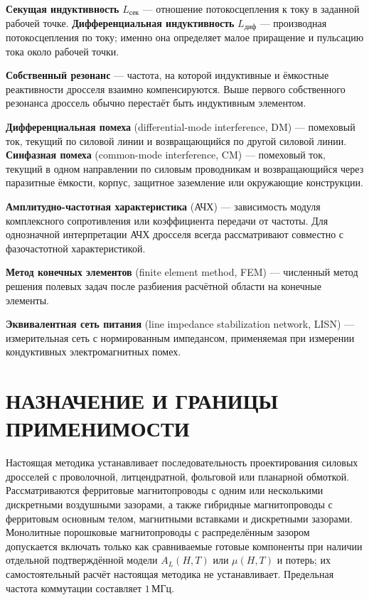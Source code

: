 \documentclass[14pt,a4paper]{extarticle}
\begin{document}
\textbf{Секущая индуктивность} $L_{\text{сек}}$ --- отношение потокосцепления
к току в заданной рабочей точке. \textbf{Дифференциальная индуктивность}
$L_{\text{диф}}$ --- производная потокосцепления по току; именно она определяет
малое приращение и пульсацию тока около рабочей точки.

\textbf{Собственный резонанс} --- частота, на которой индуктивные и ёмкостные
реактивности дросселя взаимно компенсируются. Выше первого собственного
резонанса дроссель обычно перестаёт быть индуктивным элементом.

\textbf{Дифференциальная помеха} (differential-mode interference, DM) ---
помеховый ток, текущий по силовой линии и возвращающийся по другой силовой
линии. \textbf{Синфазная помеха} (common-mode interference, CM) --- помеховый
ток, текущий в одном направлении по силовым проводникам и возвращающийся через
паразитные ёмкости, корпус, защитное заземление или окружающие конструкции.

\textbf{Амплитудно-частотная характеристика} (АЧХ) --- зависимость модуля
комплексного сопротивления или коэффициента передачи от частоты. Для
однозначной интерпретации АЧХ дросселя всегда рассматривают совместно с
фазочастотной характеристикой.

\textbf{Метод конечных элементов} (finite element method, FEM) --- численный
метод решения полевых задач после разбиения расчётной области на конечные
элементы.

\textbf{Эквивалентная сеть питания} (line impedance stabilization network,
LISN) --- измерительная сеть с нормированным импедансом, применяемая при
измерении кондуктивных электромагнитных помех.

\newpage

\section{НАЗНАЧЕНИЕ И ГРАНИЦЫ ПРИМЕНИМОСТИ}
\label{sec:scope}

Настоящая методика устанавливает последовательность проектирования силовых
дросселей с проволочной, литцендратной, фольговой или планарной обмоткой.
Рассматриваются ферритовые магнитопроводы с одним или несколькими дискретными
воздушными зазорами, а также гибридные магнитопроводы с ферритовым основным
телом, магнитными вставками и дискретными зазорами. Монолитные порошковые
магнитопроводы с распределённым зазором допускается включать только как
сравниваемые готовые компоненты при наличии отдельной подтверждённой модели
$A_L(H,T)$ или $\mu(H,T)$ и потерь; их самостоятельный расчёт настоящая
методика не устанавливает. Предельная частота коммутации составляет
$1\,\text{МГц}$.
\end{document}
